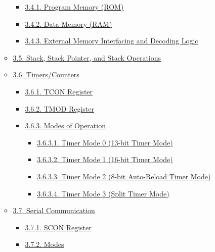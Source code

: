 \documentclass[
]{article}
\begin{document}
\begin{itemize}
\begin{itemize}
    \begin{itemize}
    \item
      \protect\hyperlink{341-program-memory-rom}{3.4.1. Program Memory
      (ROM)}
    \item
      \protect\hyperlink{342-data-memory-ram}{3.4.2. Data Memory (RAM)}
    \item
      \protect\hyperlink{343-external-memory-interfacing-and-decoding-logic}{3.4.3.
      External Memory Interfacing and Decoding Logic}
    \end{itemize}
  \item
    \protect\hyperlink{35-stack-stack-pointer-and-stack-operations}{3.5.
    Stack, Stack Pointer, and Stack Operations}
  \item
    \protect\hyperlink{36-timerscounters}{3.6. Timers/Counters}

    \begin{itemize}
    \item
      \protect\hyperlink{361-tcon-register}{3.6.1. TCON Register}
    \item
      \protect\hyperlink{362-tmod-register}{3.6.2. TMOD Register}
    \item
      \protect\hyperlink{363-modes-of-operation}{3.6.3. Modes of
      Operation}

      \begin{itemize}
      \item
        \protect\hyperlink{3631-timer-mode-0-13-bit-timer-mode}{3.6.3.1.
        Timer Mode 0 (13-bit Timer Mode)}
      \item
        \protect\hyperlink{3632-timer-mode-1-16-bit-timer-mode}{3.6.3.2.
        Timer Mode 1 (16-bit Timer Mode)}
      \item
        \protect\hyperlink{3633-timer-mode-2-8-bit-auto-reload-timer-mode}{3.6.3.3.
        Timer Mode 2 (8-bit Auto-Reload Timer Mode)}
      \item
        \protect\hyperlink{3634-timer-mode-3-split-timer-mode}{3.6.3.4.
        Timer Mode 3 (Split Timer Mode)}
      \end{itemize}
    \end{itemize}
  \item
    \protect\hyperlink{37-serial-communication}{3.7. Serial
    Communication}

    \begin{itemize}
    \item
      \protect\hyperlink{371-scon-register}{3.7.1. SCON Register}
    \item
      \protect\hyperlink{372-modes}{3.7.2. Modes}


\end{itemize}
\end{itemize}
\end{itemize}
\end{document}
